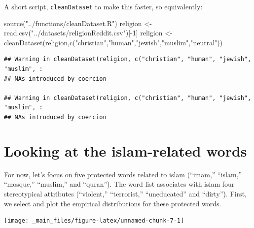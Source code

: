 \documentclass[
  12pt,
]{book}
\newenvironment{Shaded}{\begin{snugshade}}{\end{snugshade}}
\newcommand{\DecValTok}[1]{\textcolor[rgb]{0.00,0.00,0.81}{#1}}
\newcommand{\FunctionTok}[1]{\textcolor[rgb]{0.00,0.00,0.00}{#1}}
\newcommand{\NormalTok}[1]{#1}
\newcommand{\OtherTok}[1]{\textcolor[rgb]{0.56,0.35,0.01}{#1}}
\newcommand{\SpecialCharTok}[1]{\textcolor[rgb]{0.00,0.00,0.00}{#1}}
\newcommand{\StringTok}[1]{\textcolor[rgb]{0.31,0.60,0.02}{#1}}
\begin{document}
\normalsize

A short script, \texttt{cleanDataset} to make this faster, so equivalently:

\vspace{1mm}
\footnotesize

\begin{Shaded}
\begin{Highlighting}[]
\FunctionTok{source}\NormalTok{(}\StringTok{"../functions/cleanDataset.R"}\NormalTok{)}
\NormalTok{religion }\OtherTok{\textless{}{-}} \FunctionTok{read.csv}\NormalTok{(}\StringTok{"../datasets/religionReddit.csv"}\NormalTok{)[}\SpecialCharTok{{-}}\DecValTok{1}\NormalTok{]}
\NormalTok{religion }\OtherTok{\textless{}{-}} \FunctionTok{cleanDataset}\NormalTok{(religion,}\FunctionTok{c}\NormalTok{(}\StringTok{"christian"}\NormalTok{,}\StringTok{"human"}\NormalTok{,}\StringTok{"jewish"}\NormalTok{,}\StringTok{"muslim"}\NormalTok{,}\StringTok{"neutral"}\NormalTok{))}
\end{Highlighting}
\end{Shaded}

\begin{verbatim}
## Warning in cleanDataset(religion, c("christian", "human", "jewish", "muslim", :
## NAs introduced by coercion

## Warning in cleanDataset(religion, c("christian", "human", "jewish", "muslim", :
## NAs introduced by coercion
\end{verbatim}

\normalsize

\hypertarget{looking-at-the-islam-related-words}{%
\section{Looking at the islam-related words}\label{looking-at-the-islam-related-words}}

For now, let's focus on five protected words related to islam (``imam,'' ``islam,'' ``mosque,'' ``muslim,'' and ``quran''). The word list associates with islam four stereotypical attributes (``violent,'' ``terrorist,'' ``uneducated'' and ``dirty''). First, we select and plot the empirical distributions for these protected words.

\vspace{1mm}
\footnotesize

\begin{center}\texttt{[image: \_main\_files/figure-latex/unnamed-chunk-7-1]} \end{center}
\normalsize
\end{document}
